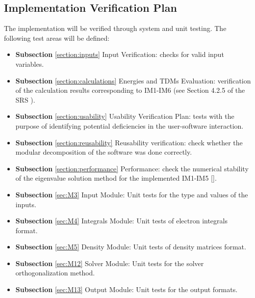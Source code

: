 \documentclass[12pt, titlepage]{article}
\begin{document}
\subsection{Implementation Verification Plan}

%
The implementation will be verified through system and unit testing. The 
following test areas will be defined:
\begin{itemize}
	\item \textbf{Subsection} \ref{section:inputs} Input Verification: 
	checks for valid input variables.
	
	\item \textbf{Subsection} 
	\ref{section:calculations} Energies and TDMs Evaluation: verification of 
	the calculation results corresponding to IM1-IM6 (see Section 4.2.5 of the 
	SRS \cite{SRS2020}).
	
	\item \textbf{Subsection} \ref{section:usability} Usability Verification 
	Plan: tests with the purpose of identifying potential deficiencies in the 
	user-software interaction.
	
	\item \textbf{Subsection} \ref{section:reusability} Reusability 
	verification: check whether the modular decomposition of the software was 
	done correctly.
	
	\item \textbf{Subsection} \ref{section:performance} Performance: check the 
	numerical stability of the eigenvalue solution method for the implemented 
	IM1-IM5 [\cite{SRS2020}].

	\item \textbf{Subsection} \ref{sec:M3} Input Module: Unit tests for the 
	type and values of the inputs.

	\item \textbf{Subsection} \ref{sec:M4} Integrals Module: Unit tests of 
	electron integrals format.
	
	\item \textbf{Subsection} \ref{sec:M5} Density Module: Unit tests of 
	density matrices format.
	
	\item \textbf{Subsection} \ref{sec:M12} Solver Module: Unit tests for the 
	solver orthogonalization method.
	
	\item \textbf{Subsection} \ref{sec:M13} Output Module: Unit tests for the 
	output formats.
\end{itemize}
\end{document}

